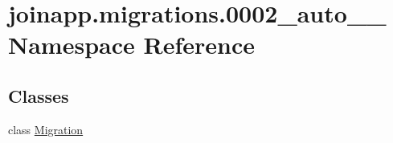 \hypertarget{namespacejoinapp_1_1migrations_1_10002__auto__20190605__1443}{}\section{joinapp.\+migrations.0002\+\_\+auto\+\_\+\_ Namespace Reference}
\label{namespacejoinapp_1_1migrations_1_10002__auto__20190605__1443}
\subsection*{Classes}
\begin{DoxyCompactItemize}
\item 
class \mbox{\hyperlink{classjoinapp_1_1migrations_1_10002__auto__20190605__1443_1_1_migration}{Migration}}
\end{DoxyCompactItemize}
